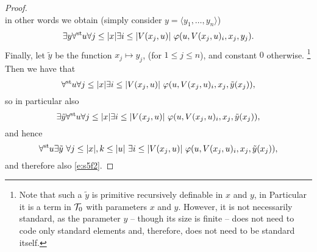\begin{proof}
\[\]
in other words we obtain (simply consider $y=\langle y_1,\ldots,y_n \rangle$)
\[
\exists y \forall^{\operatorname{st}{}}\! u \forall j\leq |x| \exists i\leq |V(x_j,u)|\ \varphi(u,V(x_j,u)_i,x_j,y_j).
\]
Finally, let $\tilde y$ be the function $x_j\mapsto y_j$, (for $1\leq j\leq n$), and constant $0$ otherwise.
\footnote{Note that such a $\tilde y$ is primitive recursively definable in $x$ and $y$, in Particular it is a term in $\mathcal{T}_0$ with parameters $x$ and $y$. However, it is not necessarily standard, as the parameter $y$ -- though its size is finite -- does not need to code only standard elements and, therefore, does not need to be standard itself.}
Then we have that
\[
\forall^{\operatorname{st}{}}\! u \forall j\leq |x| \exists i\leq |V(x_j,u)|\ \varphi(u,V(x_j,u)_i,x_j,\tilde y(x_j)),
\]
so in particular also
\[
\exists \tilde y\forall^{\operatorname{st}{}}\! u \forall j\leq |x| \exists i\leq |V(x_j,u)|\ \varphi(u,V(x_j,u)_i,x_j,\tilde y(x_j)),
\]
and hence
\[
\forall^{\operatorname{st}{}}\! u\exists \tilde y\ \forall j\leq |x|,k\leq |u|\  \exists i\leq |V(x_j,u)|\ \varphi(u,V(x_j,u)_i,x_j,\tilde y(x_j)),
\]
and therefore also \eqref{e:s5f2}.
\end{proof}

